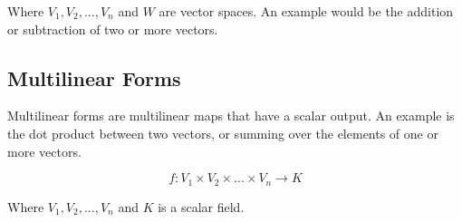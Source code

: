 Where $V_1, V_2, ... , V_n$ and $W$ are vector spaces. An example would be the addition or subtraction of two or more vectors.

\subsection{Multilinear Forms}
Multilinear forms are multilinear maps that have a scalar output. An example is the dot product between two vectors, or summing over the elements of one or more vectors.

\begin{equation}
f: V_1 \times V_2 \times ... \times V_n \rightarrow K
\end{equation}

Where $V_1, V_2, ... , V_n$ and $K$ is a scalar field.

